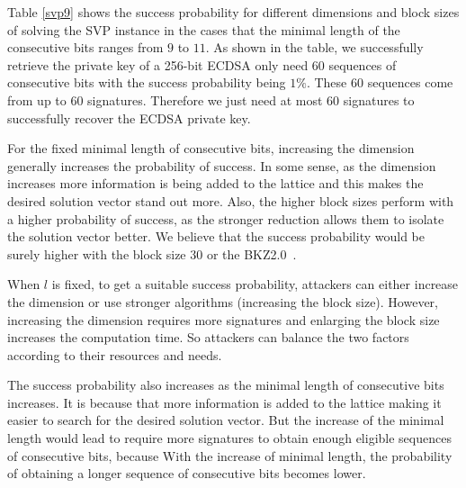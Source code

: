 Table \ref{svp9} shows the success probability for different dimensions and block sizes of solving the SVP instance in the
             cases that the minimal length of the consecutive bits ranges from $9$ to $11$.
As shown in the table, we successfully retrieve the private key of a 256-bit ECDSA only need $60$ sequences of consecutive bits with the success probability being $1\%$.
These $60$ sequences come from up to $60$ signatures.
Therefore we just need at most $60$ signatures to successfully recover the ECDSA private key.

  For the fixed  minimal length of consecutive bits,
 increasing the dimension generally increases the probability of success.
In some sense, as the dimension increases
     more information is being added to the lattice and this makes the desired solution vector stand out more.
Also, the higher block sizes perform with a higher probability of success,
 as the stronger reduction allows them to isolate the solution vector better.
  We believe that the success probability would be surely higher with the block size $30$ or the BKZ2.0~\cite{bkz2}.

When $l$ is fixed, to get a suitable success probability, attackers can either increase the dimension or use stronger algorithms (increasing the block size).
However, increasing the dimension requires more signatures
 and enlarging the block size increases the computation time.
So attackers can balance the two factors according to their resources and needs.

The success probability also increases as the minimal length of consecutive bits increases.
It is because that more information is added to the lattice making it easier to search for the desired solution vector.
But the increase of the minimal length would lead to require more signatures to obtain enough eligible sequences of consecutive bits,
 because With the increase of minimal length, the probability of obtaining  a longer sequence of consecutive bits becomes lower.


